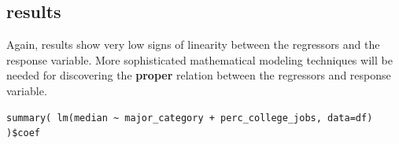 \documentclass[10pt, twoside, openleft]{article}
\begin{document}
\begin{center}
\subsection{results}
\vspace{-3ex}
\end{center}

\noindent
Again, results show very low signs of linearity between the regressors and the response
variable. More sophisticated mathematical modeling techniques will be needed for
discovering the \textbf{proper} relation between the regressors and response variable.
\smallskip

\begin{verbatim}
summary( lm(median ~ major_category + perc_college_jobs, data=df) )$coef
\end{verbatim}
\end{document}
